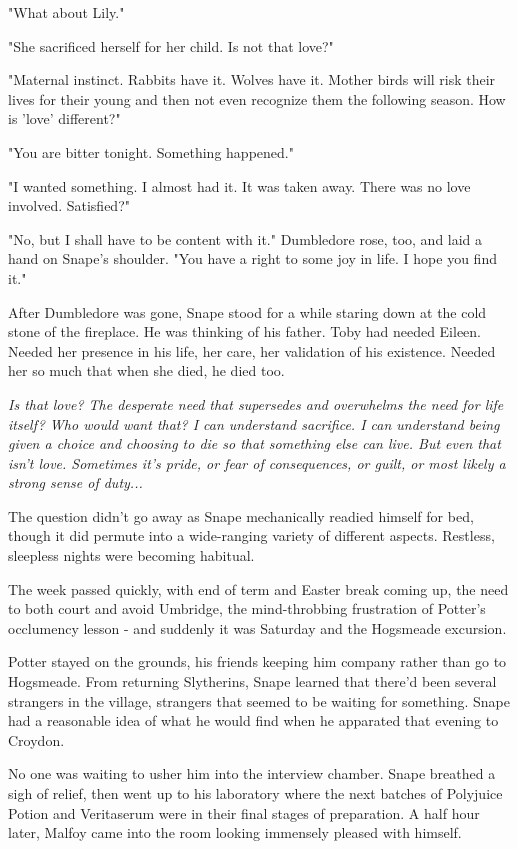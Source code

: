\documentclass[a4paper,11pt]{article}
\begin{document}
"What about Lily."

"She sacrificed herself for her child. Is not that love?"

"Maternal instinct. Rabbits have it. Wolves have it. Mother birds will risk their lives for their young and then not even recognize them the following season. How is 'love' different?"

"You are bitter tonight. Something happened."

"I wanted something. I almost had it. It was taken away. There was no love involved. Satisfied?"

"No, but I shall have to be content with it." Dumbledore rose, too, and laid a hand on Snape's shoulder. "You have a right to some joy in life. I hope you find it."

After Dumbledore was gone, Snape stood for a while staring down at the cold stone of the fireplace. He was thinking of his father. Toby had needed Eileen. Needed her presence in his life, her care, her validation of his existence. Needed her so much that when she died, he died too.

\emph{Is that love? The desperate need that supersedes and overwhelms the need for life itself? Who would want that? I can understand sacrifice. I can understand being given a choice and choosing to die so that something else can live. But even that isn't love. Sometimes it's pride, or fear of consequences, or guilt, or most likely a strong sense of duty...}

The question didn't go away as Snape mechanically readied himself for bed, though it did permute into a wide-ranging variety of different aspects. Restless, sleepless nights were becoming habitual.

The week passed quickly, with end of term and Easter break coming up, the need to both court and avoid Umbridge, the mind-throbbing frustration of Potter's occlumency lesson - and suddenly it was Saturday and the Hogsmeade excursion.

Potter stayed on the grounds, his friends keeping him company rather than go to Hogsmeade. From returning Slytherins, Snape learned that there'd been several strangers in the village, strangers that seemed to be waiting for something. Snape had a reasonable idea of what he would find when he apparated that evening to Croydon.

No one was waiting to usher him into the interview chamber. Snape breathed a sigh of relief, then went up to his laboratory where the next batches of Polyjuice Potion and Veritaserum were in their final stages of preparation. A half hour later, Malfoy came into the room looking immensely pleased with himself.
\end{document}
